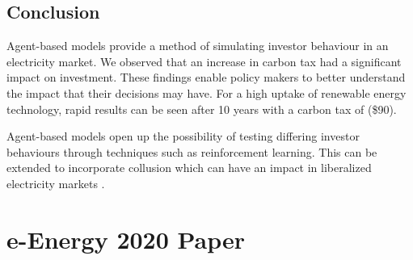 \subsection{Conclusion}


Agent-based models provide a method of simulating investor behaviour in an electricity market. We observed that an increase in carbon tax had a significant impact on investment. These findings enable policy makers to better understand the impact that their decisions may have. For a high uptake of renewable energy technology, rapid results can be seen after 10 years with a carbon tax of  (\$90).

Agent-based models open up the possibility of testing differing investor behaviours through techniques such as reinforcement learning. This can be extended to incorporate collusion which can have an impact in liberalized electricity markets \cite{Benjamin2016}.




\section{e-Energy 2020 Paper}

